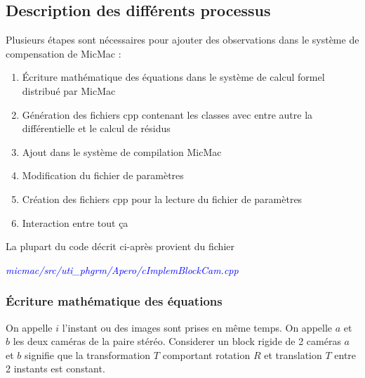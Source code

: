 \documentclass{article}
\newcommand\file[1]{
\textit{\textcolor{blue}{#1}}
}
\begin{document}
\subsection{Description des différents processus}

% 

Plusieurs étapes sont nécessaires pour ajouter des observations dans le système de compensation de MicMac :
\begin{enumerate}
\item Écriture mathématique des équations dans le système de calcul formel distribué par MicMac
\item Génération des fichiers cpp contenant les classes avec entre autre la différentielle et le calcul de résidus
\item Ajout dans le système de compilation MicMac
\item Modification du fichier de paramètres
\item Création des fichiers cpp pour la lecture du fichier de paramètres
\item Interaction entre tout ça
\end{enumerate}


La plupart du code décrit ci-après provient du fichier 

\noindent \file{micmac/src/uti\_phgrm/Apero/cImplemBlockCam.cpp}

\subsubsection{Écriture mathématique des équations}

On appelle $i$ l'instant ou des images sont prises en même temps.
On appelle $a$ et $b$ les deux caméras de la paire stéréo.
Considerer un block rigide de 2 caméras $a$ et $b$ signifie  que la transformation $T$ comportant rotation $R$ et translation $T$ entre 2 instants est constant.
\end{document}
